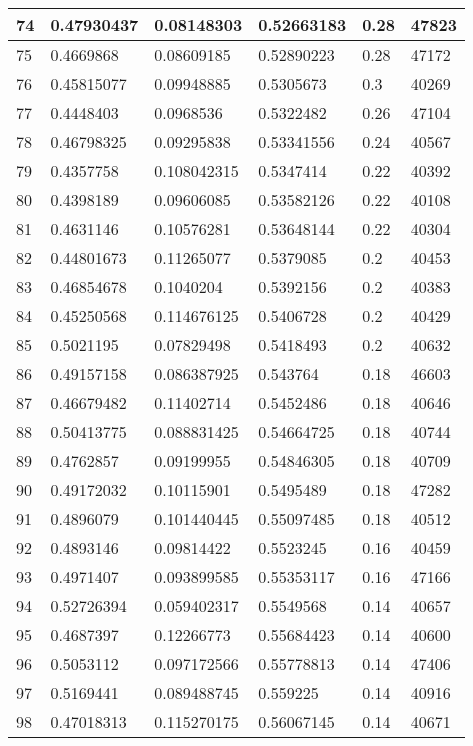 \begin{longtable}{|l|l|l|l|l|l|}
74 & 0.47930437 & 0.08148303 & 0.52663183 & 0.28 & 47823 \\ \hline 
75 & 0.4669868 & 0.08609185 & 0.52890223 & 0.28 & 47172 \\ \hline 
76 & 0.45815077 & 0.09948885 & 0.5305673 & 0.3 & 40269 \\ \hline 
77 & 0.4448403 & 0.0968536 & 0.5322482 & 0.26 & 47104 \\ \hline 
78 & 0.46798325 & 0.09295838 & 0.53341556 & 0.24 & 40567 \\ \hline 
79 & 0.4357758 & 0.108042315 & 0.5347414 & 0.22 & 40392 \\ \hline 
80 & 0.4398189 & 0.09606085 & 0.53582126 & 0.22 & 40108 \\ \hline 
81 & 0.4631146 & 0.10576281 & 0.53648144 & 0.22 & 40304 \\ \hline 
82 & 0.44801673 & 0.11265077 & 0.5379085 & 0.2 & 40453 \\ \hline 
83 & 0.46854678 & 0.1040204 & 0.5392156 & 0.2 & 40383 \\ \hline 
84 & 0.45250568 & 0.114676125 & 0.5406728 & 0.2 & 40429 \\ \hline 
85 & 0.5021195 & 0.07829498 & 0.5418493 & 0.2 & 40632 \\ \hline 
86 & 0.49157158 & 0.086387925 & 0.543764 & 0.18 & 46603 \\ \hline 
87 & 0.46679482 & 0.11402714 & 0.5452486 & 0.18 & 40646 \\ \hline 
88 & 0.50413775 & 0.088831425 & 0.54664725 & 0.18 & 40744 \\ \hline 
89 & 0.4762857 & 0.09199955 & 0.54846305 & 0.18 & 40709 \\ \hline 
90 & 0.49172032 & 0.10115901 & 0.5495489 & 0.18 & 47282 \\ \hline 
91 & 0.4896079 & 0.101440445 & 0.55097485 & 0.18 & 40512 \\ \hline 
92 & 0.4893146 & 0.09814422 & 0.5523245 & 0.16 & 40459 \\ \hline 
93 & 0.4971407 & 0.093899585 & 0.55353117 & 0.16 & 47166 \\ \hline 
94 & 0.52726394 & 0.059402317 & 0.5549568 & 0.14 & 40657 \\ \hline 
95 & 0.4687397 & 0.12266773 & 0.55684423 & 0.14 & 40600 \\ \hline 
96 & 0.5053112 & 0.097172566 & 0.55778813 & 0.14 & 47406 \\ \hline 
97 & 0.5169441 & 0.089488745 & 0.559225 & 0.14 & 40916 \\ \hline 
98 & 0.47018313 & 0.115270175 & 0.56067145 & 0.14 & 40671 \\ \hline 

\end{longtable}
